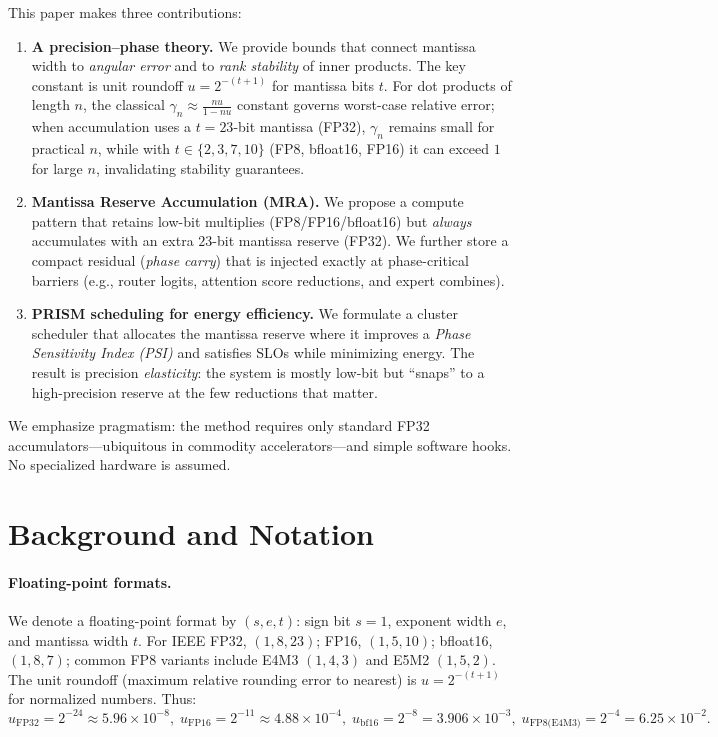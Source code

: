 \documentclass[11pt]{article}
\theoremstyle{plain}
\theoremstyle{definition}
\begin{document}
This paper makes three contributions:

\begin{enumerate}
  \item \textbf{A precision--phase theory.} We provide bounds that connect mantissa width to \emph{angular error} and to \emph{rank stability} of inner products. The key constant is unit roundoff $u=2^{-(t+1)}$ for mantissa bits $t$. For dot products of length $n$, the classical $\gamma_n \approx \frac{nu}{1-nu}$ constant governs worst-case relative error; when accumulation uses a $t=23$-bit mantissa (FP32), $\gamma_n$ remains small for practical $n$, while with $t\in\{2,3,7,10\}$ (FP8, bfloat16, FP16) it can exceed $1$ for large $n$, invalidating stability guarantees.
  \item \textbf{Mantissa Reserve Accumulation (MRA).} We propose a compute pattern that retains low-bit multiplies (FP8/FP16/bfloat16) but \emph{always} accumulates with an extra $23$-bit mantissa reserve (FP32). We further store a compact residual (\emph{phase carry}) that is injected exactly at phase-critical barriers (e.g., router logits, attention score reductions, and expert combines).
  \item \textbf{PRISM scheduling for energy efficiency.} We formulate a cluster scheduler that allocates the mantissa reserve where it improves a \emph{Phase Sensitivity Index (PSI)} and satisfies SLOs while minimizing energy. The result is precision \emph{elasticity}: the system is mostly low-bit but ``snaps'' to a high-precision reserve at the few reductions that matter.
\end{enumerate}

We emphasize pragmatism: the method requires only standard FP32 accumulators---ubiquitous in commodity accelerators---and simple software hooks. No specialized hardware is assumed.

\section{Background and Notation}

\paragraph{Floating-point formats.}
We denote a floating-point format by $(s,e,t)$: sign bit $s=1$, exponent width $e$, and mantissa width $t$. For IEEE FP32, $(1,8,23)$; FP16, $(1,5,10)$; bfloat16, $(1,8,7)$; common FP8 variants include E4M3 $(1,4,3)$ and E5M2 $(1,5,2)$. The unit roundoff (maximum relative rounding error to nearest) is $u=2^{-(t+1)}$ for normalized numbers. Thus:
\[
u_{\text{FP32}} = 2^{-24}\approx 5.96\times 10^{-8},\;
u_{\text{FP16}} = 2^{-11} \approx 4.88\times 10^{-4},\;
u_{\text{bf16}} = 2^{-8} = 3.906\times 10^{-3},\;
u_{\text{FP8(E4M3)}} = 2^{-4}=6.25\times 10^{-2}.
\]
\end{document}
